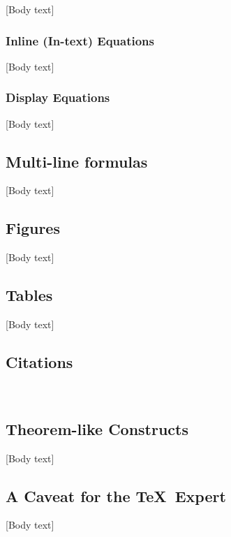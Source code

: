 \documentclass{sig-alternate}
\begin{document}
[Body text]

\subsubsection{Inline (In-text) Equations}
\label{sec:inlineEquations}

[Body text]

\subsubsection{Display Equations}
\label{sec:displayEquations}

[Body text]

\subsection{Multi-line formulas}
\label{sec:multiLineFormulas}

[Body text]

\subsection{Figures}
\label{sec:figures}

[Body text]

\subsection{Tables}
\label{sec:tables}

[Body text]

\subsection{Citations}
\label{sec:citations}

\cite{Aaronson:2005,Garey:1979,Brun:2008}
~\cite{OM:2008}

\subsection{Theorem-like Constructs}
\label{sec:theoremLikeConstructs}

[Body text]

\subsection*{A {\secit Caveat} for the \TeX\ Expert}
\label{sec:caveatForExperts}

[Body text]
\end{document}
